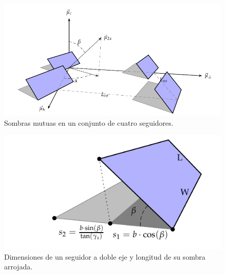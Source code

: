\begin{figure}
\begin{centering}
\includegraphics{../figs/Sombras2X}
\end{centering}

\caption{\label{fig:Sombras2X}Sombras mutuas en un conjunto de cuatro seguidores.}

\end{figure}

%
\begin{figure}
\begin{centering}
\includegraphics{../figs/DimensionesSeguidorSombra}
\end{centering}

\caption{\label{fig:DimensionesSeguidorSombra}Dimensiones de un seguidor a
doble eje y longitud de su sombra arrojada.}

\end{figure}


